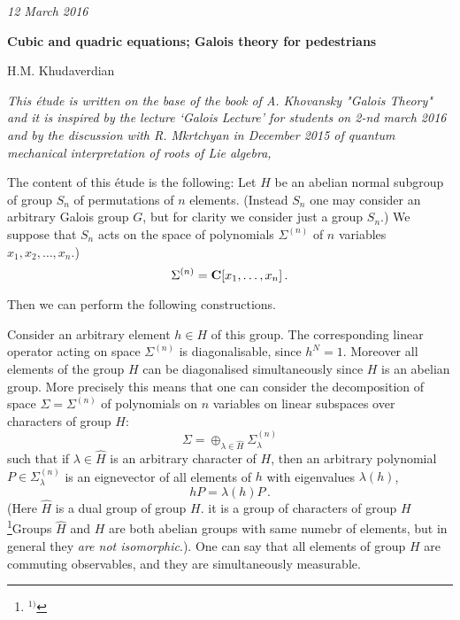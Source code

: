  \baselineskip=14pt



\def \finish {${\,\,\vrule height1mm depth2mm width 8pt}$}



\def\p {\partial}
\def \D {\Delta_{d{\bf v}}}
\def \Ds  {\Delta^{\#}}
\def\t{\tilde}
\def\s {\sigma}
\def\vare {\varepsilon}
\def\L {\Lambda}
\def\Darboux {$z^A=$  $x^1,\dots,x^n$, $\theta_1,\dots,\theta_n$}
\def\a{\alpha}
\def\O{\Omega}
\def\d{\delta}
\def\dv  {{d{\bf{v}}}}
\def\A {{\cal A}}
\def\R {I\!R}
\def\t {\tilde}
\def\l {\lambda}
\def\e {{\bf e}}
\def\x {{\bf x}}
\def\y {{\bf y}}



{\it 12 March 2016}

             \centerline {\bf
Cubic and quadric equations; Galois theory for pedestrians}

       \centerline{   H.M. Khudaverdian}

{\it This \'etude  is 
written on the base of the book of A. Khovansky
"Galois Theory" and it is inspired 
by the lecture `Galois Lecture' for students 
on 2-nd march 2016 and by the discussion with 
R. Mkrtchyan in December 2015 of
 quantum mechanical interpretation of roots of Lie algebra,}




 The content of this \'etude is the following: Let
  $H$ be an abelian normal 
subgroup of group $S_n$ of permutations of $n$ elements.
 (Instead $S_n$ one may consider an arbitrary Galois group $G$,
but for clarity we consider just a group $S_n$.)
  We suppose that $S_n$ acts on the space of polynomials $\Sigma^{(n)}$
of $n$ variables $x_1,x_2,\dots,x_n$.)
       $$
\Sigma^{(n)}={\bf C}[x_1,\dots,x_n]\,.
       $$


Then we can perform the following constructions.

Consider an arbitrary element $h\in H$ of this group.
The corresponding linear operator acting on space $\Sigma^{(n)}$
is diagonalisable, since $h^N=1$. Moreover all elements
of the group $H$ can be diagonalised 
simultaneously since $H$ is an abelian group.
More precisely this means that 
one can consider the decomposition of
space $\Sigma=\Sigma^{(n)}$ of polynomials on $n$ variables
 on linear subspaces over characters of group $H$:
       $$
\Sigma=\oplus_{\l\in \hat H}\Sigma^{(n)}_{\l}
       $$
such that if $\l\in \hat H$ is an arbitrary
character of $H$, then  an arbitrary polynomial $P\in\Sigma^{(n)}_\l$
is an eignevector of all elements of $h$ with eigenvalues
  $\l(h)$,
        $$
  h P=\lambda(h)P\,.
       $$
(Here $\hat H$ is a dual group of group $H$. it is 
a  group of characters of group $H$
\footnote{$^{1)}$}{Groups
  $\hat H$ and $H$ are both abelian groups with 
same numebr of elements,
but in general they {\it are not isomorphic}.}).
One can say that
all elements of group $H$ are commuting observables,
and they are simultaneously measurable.

